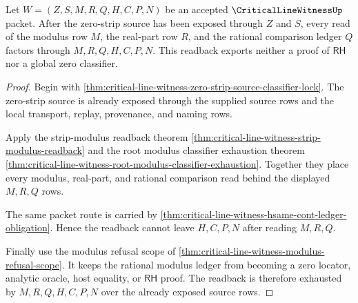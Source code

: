 \begin{theorem}
\label{thm:critical-line-witness-modulus-ledger-readback-exhaustion}
Let $W=(Z,S,M,R,Q,H,C,P,N)$ be an accepted $\CriticalLineWitnessUp$ packet. After the zero-strip source has been exposed through $Z$ and $S$, every read of the modulus row $M$, the real-part row $R$, and the rational comparison ledger $Q$ factors through $M,R,Q,H,C,P,N$. This readback exports neither a proof of $\mathsf{RH}$ nor a global zero classifier.
\end{theorem}
\begin{proof}
Begin with \autoref{thm:critical-line-witness-zero-strip-source-classifier-lock}. The zero-strip source is already exposed through the supplied source rows and the local transport, replay, provenance, and naming rows.

Apply the strip-modulus readback theorem \autoref{thm:critical-line-witness-strip-modulus-readback} and the root modulus classifier exhaustion theorem \autoref{thm:critical-line-witness-root-modulus-classifier-exhaustion}. Together they place every modulus, real-part, and rational comparison read behind the displayed $M,R,Q$ rows.

The same packet route is carried by \autoref{thm:critical-line-witness-hsame-cont-ledger-obligation}. Hence the readback cannot leave $H,C,P,N$ after reading $M,R,Q$.

Finally use the modulus refusal scope of \autoref{thm:critical-line-witness-modulus-refusal-scope}. It keeps the rational modulus ledger from becoming a zero locator, analytic oracle, host equality, or $\mathsf{RH}$ proof. The readback is therefore exhausted by $M,R,Q,H,C,P,N$ over the already exposed source rows.
\end{proof}

